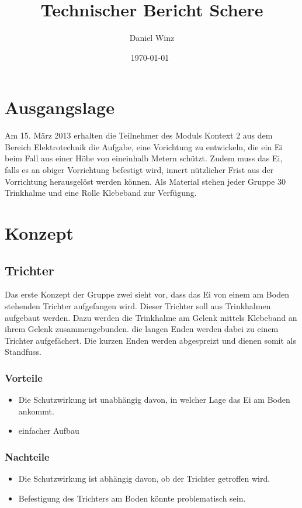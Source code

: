\documentclass[a4paper,10pt,fleqn]{article}
\title{Technischer Bericht Schere}
\author{Daniel Winz}
\date{\today~\dtc}
\begin{document}
\maketitle

% 

\tableofcontents
\newpage

% 
\section{Ausgangslage}
Am 15. März 2013 erhalten die Teilnehmer des Moduls Kontext 2 aus dem Bereich 
Elektrotechnik die Aufgabe, eine Vorichtung zu entwickeln, die ein Ei beim Fall 
aus einer Höhe von eineinhalb Metern schützt. Zudem muss das Ei, falls es an 
obiger Vorrichtung befestigt wird, innert nützlicher Frist aus der Vorrichtung 
herausgelöst werden können. Als Material stehen jeder Gruppe 30 Trinkhalme und 
eine Rolle Klebeband zur Verfügung. 
\cite{barmet:aufgabenstellung}

\section{Konzept}
\subsection{Trichter}
Das erste Konzept der Gruppe zwei sieht vor, dass das Ei von einem am Boden 
stehenden Trichter aufgefangen wird. Dieser Trichter soll aus Trinkhalmen 
aufgebaut werden. Dazu werden die Trinkhalme am Gelenk mittels Klebeband an 
ihrem Gelenk zusammengebunden. die langen Enden werden dabei zu einem Trichter 
aufgefächert. Die kurzen Enden werden abgespreizt und dienen somit als 
Standfuss. 

\subsubsection*{Vorteile}
\begin{itemize}
  \item Die Schutzwirkung ist unabhängig davon, in welcher Lage das Ei am Boden 
        ankommt. 
  \item einfacher Aufbau
\end{itemize}

\subsubsection*{Nachteile}
\begin{itemize}
  \item Die Schutzwirkung ist abhängig davon, ob der Trichter getroffen wird. 
  \item Befestigung des Trichters am Boden könnte problematisch sein. 
\end{itemize}
\end{document}
